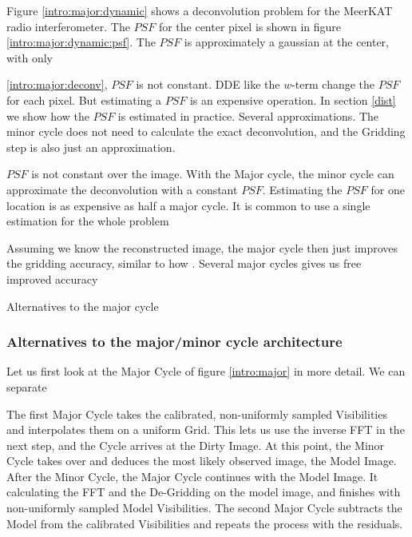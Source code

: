Figure \ref{intro:major:dynamic} shows a deconvolution problem for the MeerKAT radio interferometer. The $PSF$ for the center pixel is shown in figure \ref{intro:major:dynamic:psf}. The $PSF$ is approximately a gaussian at the center, with only

\eqref{intro:major:deconv}, $PSF$ is not constant. DDE like the $w$-term change the $PSF$ for each pixel. But estimating a $PSF$ is an expensive operation. In section \ref{dist} we show how the $PSF$ is estimated in practice. 
Several approximations. The minor cycle does not need to calculate the exact deconvolution, and the Gridding step is also just an approximation.

$PSF$ is not constant over the image. With the Major cycle, the minor cycle can approximate the deconvolution with a constant $PSF$. Estimating the $PSF$ for one location is as expensive as half a major cycle. It is common to use a single estimation for the whole problem

Assuming we know the reconstructed image, the major cycle then just improves the gridding accuracy, similar to how \cite{kunisnonequispaced}.
Several major cycles gives us free improved accuracy 



Alternatives to the major cycle


\subsubsection{Alternatives to the major/minor cycle architecture}





















Let us first look at the Major Cycle of figure \ref{intro:major} in more detail. We can separate


The first Major Cycle takes the calibrated, non-uniformly sampled Visibilities and interpolates them on a uniform Grid. This lets us use the inverse FFT in the next step, and the Cycle arrives at the Dirty Image. At this point, the Minor Cycle takes over and deduces the most likely observed image, the Model Image. After the Minor Cycle, the Major Cycle continues with the Model Image. It calculating the FFT and the De-Gridding on the model image, and finishes with non-uniformly sampled Model Visibilities. The second Major Cycle subtracts the Model from the calibrated Visibilities and repeats the process with the residuals.

